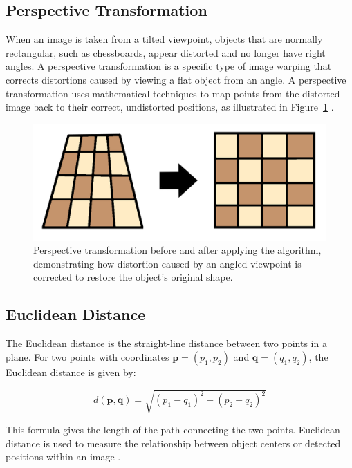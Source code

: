 \subsection*{Perspective Transformation}

When an image is taken from a tilted viewpoint, objects that are normally rectangular, such as chessboards, appear distorted and no longer have right angles. A perspective transformation is a specific type of image warping that corrects distortions caused by viewing a flat object from an angle. A perspective transformation uses mathematical techniques to map points from the distorted image back to their correct, undistorted positions, as illustrated in Figure~\ref{fig:perspective-transformation} \cite{nvidia:perspective-transform}.


\begin{figure}[h!]
    \centering
    \includegraphics[width=0.75\linewidth]{figures/theory/image-recognition/perspective-transformation.png}
    \caption[Perspective transformation before and after]{Perspective transformation before and after applying the algorithm, demonstrating how distortion caused by an angled viewpoint is corrected to restore the object’s original shape.}
    \label{fig:perspective-transformation}
\end{figure}

\subsection*{Euclidean Distance}


The Euclidean distance is the straight-line distance between two points in a plane. For two points with coordinates \( \mathbf{p} = (p_1, p_2) \) and \( \mathbf{q} = (q_1, q_2) \), the Euclidean distance is given by:

\[
d(\mathbf{p}, \mathbf{q}) = \sqrt{(p_1 - q_1)^2 + (p_2 - q_2)^2}
\]

This formula gives the length of the path connecting the two points. Euclidean distance is used to measure the relationship between object centers or detected positions within an image \cite{cohen:precalculus}.



